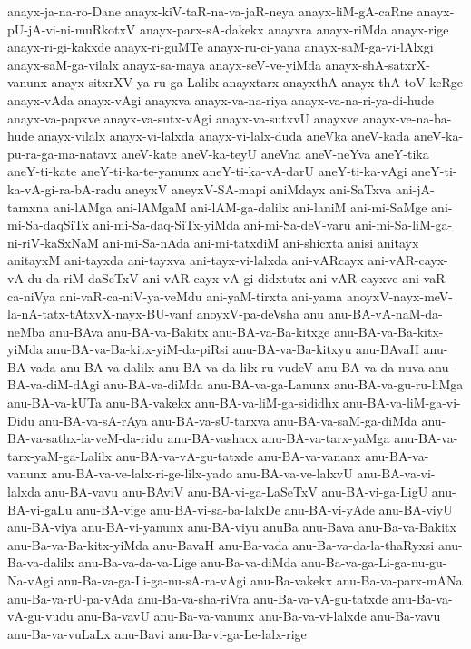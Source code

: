 {anayx-ja-na-ro-Dane
anayx-kiV-taR-na-va-jaR-neya
anayx-liM-gA-caRne
anayx-pU-jA-vi-ni-muRkotxV
anayx-parx-sA-dakekx
anayxra
anayx-riMda
anayx-rige
anayx-ri-gi-kakxde
anayx-ri-guMTe
anayx-ru-ci-yana
anayx-saM-ga-vi-lAlxgi
anayx-saM-ga-vilalx
anayx-sa-maya
anayx-seV-ve-yiMda
anayx-shA-satxrX-vanunx
anayx-sitxrXV-ya-ru-ga-Lalilx
anayxtarx
anayxthA
anayx-thA-toV-keRge
anayx-vAda
anayx-vAgi
anayxva
anayx-va-na-riya
anayx-va-na-ri-ya-di-hude
anayx-va-papxve
anayx-va-sutx-vAgi
anayx-va-sutxvU
anayxve
anayx-ve-na-ba-hude
anayx-vilalx
anayx-vi-lalxda
anayx-vi-lalx-duda
aneVka
aneV-kada
aneV-ka-pu-ra-ga-ma-natavx
aneV-kate
aneV-ka-teyU
aneVna
aneV-neYva
aneY-tika
aneY-ti-kate
aneY-ti-ka-te-yanunx
aneY-ti-ka-vA-darU
aneY-ti-ka-vAgi
aneY-ti-ka-vA-gi-ra-bA-radu
aneyxV
aneyxV-SA-mapi
aniMdayx
ani-SaTxva
ani-jA-tamxna
ani-lAMga
ani-lAMgaM
ani-lAM-ga-dalilx
ani-laniM
ani-mi-SaMge
ani-mi-Sa-daqSiTx
ani-mi-Sa-daq-SiTx-yiMda
ani-mi-Sa-deV-varu
ani-mi-Sa-liM-ga-ni-riV-kaSxNaM
ani-mi-Sa-nAda
ani-mi-tatxdiM
ani-shicxta
anisi
anitayx
anitayxM
ani-tayxda
ani-tayxva
ani-tayx-vi-lalxda
ani-vARcayx
ani-vAR-cayx-vA-du-da-riM-daSeTxV
ani-vAR-cayx-vA-gi-didxtutx
ani-vAR-cayxve
ani-vaR-ca-niVya
ani-vaR-ca-niV-ya-veMdu
ani-yaM-tirxta
ani-yama
anoyxV-nayx-meV-la-nA-tatx-tAtxvX-nayx-BU-vanf
anoyxV-pa-deVsha
anu
anu-BA-vA-naM-da-neMba
anu-BAva
anu-BA-va-Bakitx
anu-BA-va-Ba-kitxge
anu-BA-va-Ba-kitx-yiMda
anu-BA-va-Ba-kitx-yiM-da-piRsi
anu-BA-va-Ba-kitxyu
anu-BAvaH
anu-BA-vada
anu-BA-va-dalilx
anu-BA-va-da-lilx-ru-vudeV
anu-BA-va-da-nuva
anu-BA-va-diM-dAgi
anu-BA-va-diMda
anu-BA-va-ga-Lanunx
anu-BA-va-gu-ru-liMga
anu-BA-va-kUTa
anu-BA-vakekx
anu-BA-va-liM-ga-sididhx
anu-BA-va-liM-ga-vi-Didu
anu-BA-va-sA-rAya
anu-BA-va-sU-tarxva
anu-BA-va-saM-ga-diMda
anu-BA-va-sathx-la-veM-da-ridu
anu-BA-vashacx
anu-BA-va-tarx-yaMga
anu-BA-va-tarx-yaM-ga-Lalilx
anu-BA-va-vA-gu-tatxde
anu-BA-va-vananx
anu-BA-va-vanunx
anu-BA-va-ve-lalx-ri-ge-lilx-yado
anu-BA-va-ve-lalxvU
anu-BA-va-vi-lalxda
anu-BA-vavu
anu-BAviV
anu-BA-vi-ga-LaSeTxV
anu-BA-vi-ga-LigU
anu-BA-vi-gaLu
anu-BA-vige
anu-BA-vi-sa-ba-lalxDe
anu-BA-vi-yAde
anu-BA-viyU
anu-BA-viya
anu-BA-vi-yanunx
anu-BA-viyu
anuBa
anu-Bava
anu-Ba-va-Bakitx
anu-Ba-va-Ba-kitx-yiMda
anu-BavaH
anu-Ba-vada
anu-Ba-va-da-la-thaRyxsi
anu-Ba-va-dalilx
anu-Ba-va-da-va-Lige
anu-Ba-va-diMda
anu-Ba-va-ga-Li-ga-nu-gu-Na-vAgi
anu-Ba-va-ga-Li-ga-nu-sA-ra-vAgi
anu-Ba-vakekx
anu-Ba-va-parx-mANa
anu-Ba-va-rU-pa-vAda
anu-Ba-va-sha-riVra
anu-Ba-va-vA-gu-tatxde
anu-Ba-va-vA-gu-vudu
anu-Ba-vavU
anu-Ba-va-vanunx
anu-Ba-va-vi-lalxde
anu-Ba-vavu
anu-Ba-va-vuLaLx
anu-Bavi
anu-Ba-vi-ga-Le-lalx-rige
}
